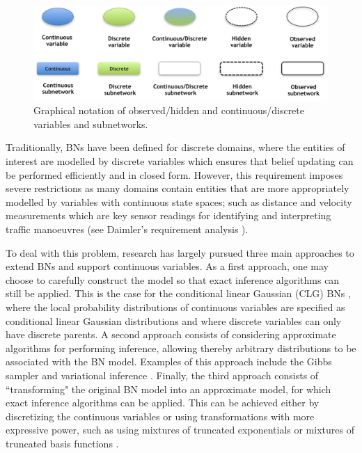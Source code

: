 \begin{figure}[ht!]
\begin{center}
\includegraphics[scale=0.55]{./figures/PreliminariesNotation}
\caption{\label{Figure:PreliminariesNotation}Graphical notation of observed/hidden and continuous/discrete variables and subnetworks.
}
\end{center}
\end{figure}


Traditionally, BNs have been defined for discrete domains, where the entities of interest are modelled by discrete variables which ensures that belief updating can be performed efficiently and in closed form. However, this requirement imposes severe restrictions as many domains contain entities that are more appropriately modelled by variables with continuous state spaces; such as distance and velocity measurements which are key sensor readings for identifying and interpreting traffic manoeuvres (see Daimler's requirement analysis \cite{Fer14}). 

To deal with this problem, research has largely pursued three main approaches to extend BNs and support continuous variables. As a first approach, one may choose to carefully construct the model so that exact inference algorithms can still be applied. This is the case for the conditional linear Gaussian (CLG) BNs \cite{Lauritzen1992,LauritzenJensen2001}, where the local probability distributions of continuous variables are specified as conditional linear Gaussian distributions and where discrete variables can only have discrete parents. A second approach consists of considering approximate algorithms for performing inference, allowing thereby arbitrary distributions to be associated with the BN model. Examples of this approach include the Gibbs sampler \cite{Geman1984, hrycej1990gibbs} and variational inference \cite{Jordan1999}. Finally, the third approach consists of ``transforming" the original BN model into an approximate model, for which exact inference algorithms can be applied. This can be achieved either by discretizing the continuous variables \cite{KozlovKollerUAI97} or using transformations with more expressive power, such as using mixtures of truncated exponentials \cite{Moral2001} or mixtures of truncated basis functions \cite{Langseth12}.

